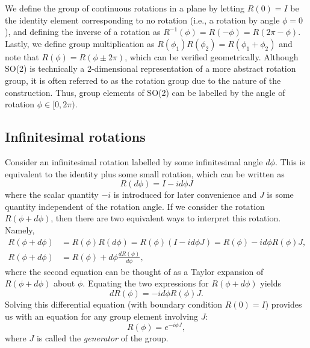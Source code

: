 We define the group of continuous rotations in a plane by letting $R(0) = I$ be the identity element corresponding to no rotation (i.e., a rotation by angle $\phi=0$), and defining the inverse of a rotation as $R^{-1}(\phi) = R(-\phi) = R(2\pi-\phi)$. Lastly, we define group multiplication as $R(\phi_1)R(\phi_2) = R(\phi_1+\phi_2)$ and note that $R(\phi) = R(\phi\pm2\pi)$, which can be verified geometrically. Although SO(2) is technically a 2-dimensional representation of a more abstract rotation group, it is often referred to as the rotation group due to the nature of the construction. Thus, group elements of SO(2) can be labelled by the angle of rotation $\phi\in[0,2\pi)$.

\subsection{Infinitesimal rotations}\label{sub:inf_rot}
Consider an infinitesimal rotation labelled by some infinitesimal angle $d\phi$. This is equivalent to the identity plus some small rotation, which can be written as
\begin{equation}
    R(d\phi) = I - i d\phi J \label{eq:dphi}
\end{equation}
where the scalar quantity $-i$ is introduced for later convenience and $J$ is some quantity independent of the rotation angle. If we consider the rotation $R(\phi + d\phi)$, then there are two equivalent ways to interpret this rotation. Namely,
\begin{align}
    R(\phi + d\phi) &= R(\phi)R(d\phi) = R(\phi)(I - i d\phi J) = R(\phi) - i d\phi R(\phi)J,\label{eq:dphi1} \\
    R(\phi + d\phi) &= R(\phi) + d\phi\frac{dR(\phi)}{d\phi},\label{eq:dphi2}
\end{align}
where the second equation can be thought of as a Taylor expansion of $R(\phi + d\phi)$ about $\phi$. Equating the two expressions for $R(\phi + d\phi)$ yields
\begin{equation}
    dR(\phi) = -id\phi R(\phi)J.
\end{equation}
Solving this differential equation (with boundary condition $R(0)=I$) provides us with an equation for any group element involving $J$:
\begin{equation}
    R(\phi) = e^{-i\phi J},
\end{equation}
where $J$ is called the \textit{generator} of the group.

